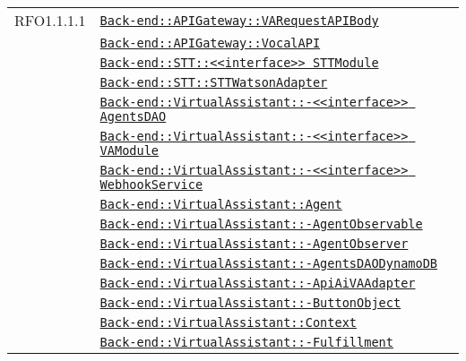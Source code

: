 \begin{longtable}{|>{\centering}m{3cm}|m{10cm}<{\centering}|}
RFO1.1.1.1 & \hyperref[Back-end::APIGateway::VARequestAPIBody]{\texttt{Back-end::APIGateway::VARequestAPIBody}}\\
& \hyperref[Back-end::APIGateway::VocalAPI]{\texttt{Back-end::APIGateway::VocalAPI}}\\
& \hyperref[Back-end::STT::<<interface>> STTModule]{\texttt{Back-end::STT::<<interface>> STTModule}}\\
& \hyperref[Back-end::STT::STTWatsonAdapter]{\texttt{Back-end::STT::STTWatsonAdapter}}\\
& \hyperref[Back-end::VirtualAssistant::<<interface>> AgentsDAO]{\texttt{Back-end::VirtualAssistant::-\linebreak <<interface>> AgentsDAO}}\\
& \hyperref[Back-end::VirtualAssistant::<<interface>> VAModule]{\texttt{Back-end::VirtualAssistant::-\linebreak <<interface>> VAModule}}\\
& \hyperref[Back-end::VirtualAssistant::<<interface>> WebhookService]{\texttt{Back-end::VirtualAssistant::-\linebreak <<interface>> WebhookService}}\\
& \hyperref[Back-end::VirtualAssistant::Agent]{\texttt{Back-end::VirtualAssistant::Agent}}\\
& \hyperref[Back-end::VirtualAssistant::AgentObservable]{\texttt{Back-end::VirtualAssistant::-\linebreak AgentObservable}}\\
& \hyperref[Back-end::VirtualAssistant::AgentObserver]{\texttt{Back-end::VirtualAssistant::-\linebreak AgentObserver}}\\
& \hyperref[Back-end::VirtualAssistant::AgentsDAODynamoDB]{\texttt{Back-end::VirtualAssistant::-\linebreak AgentsDAODynamoDB}}\\
& \hyperref[Back-end::VirtualAssistant::ApiAiVAAdapter]{\texttt{Back-end::VirtualAssistant::-\linebreak ApiAiVAAdapter}}\\
& \hyperref[Back-end::VirtualAssistant::ButtonObject]{\texttt{Back-end::VirtualAssistant::-\linebreak ButtonObject}}\\
& \hyperref[Back-end::VirtualAssistant::Context]{\texttt{Back-end::VirtualAssistant::Context}}\\
& \hyperref[Back-end::VirtualAssistant::Fulfillment]{\texttt{Back-end::VirtualAssistant::-\linebreak Fulfillment}}\\

\end{longtable}
